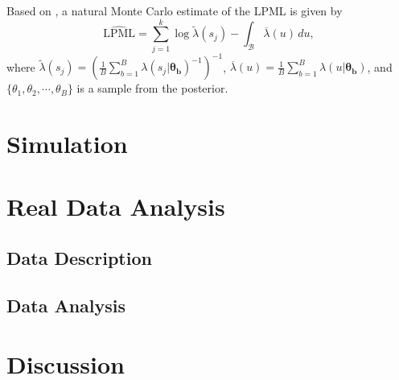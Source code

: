\documentclass[12pt]{article}
\begin{document}
Based on \citet{hu2019bayesianmodel}, a natural Monte Carlo estimate of the LPML
is given by
\begin{equation}
  \widehat{\text{LPML}}
= \sum_{j=1}^k\log \widetilde{\lambda}(s_j)-\int_{\mathcal{B}}\overline{\lambda}(u)\,du,
\end{equation}
where
$\widetilde{\lambda}(s_j)=(\frac{1}{B}\sum_{b=1}^B\lambda(s_j|\bm{\theta_b})^{-1})^{-1}$,
$\overline{\lambda}(u)=\frac{1}{B}\sum_{b=1}^B
\lambda(u|\bm{\theta_b}) $, and $\{\theta_1,\theta_2,\cdots,\theta_B\}$ is a sample
from the posterior.

\section{Simulation}\label{sec:simu}

\section{Real Data Analysis}\label{sec:real_data}
\subsection{Data Description}
\subsection{Data Analysis}

\section{Discussion}\label{sec:discussion}




\end{document}
